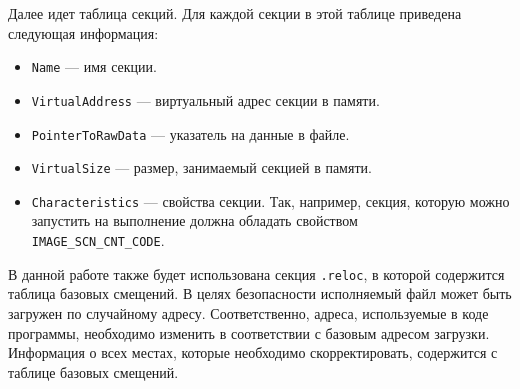 Далее идет таблица секций. Для каждой секции в этой таблице приведена следующая
информация:
\begin{itemize}
  \item \verb!Name! --- имя секции. 
  \item \verb!VirtualAddress! --- виртуальный адрес секции в памяти.
  \item \verb!PointerToRawData! --- указатель на данные в файле.
  \item \verb!VirtualSize! --- размер, занимаемый секцией в памяти.
  \item \verb!Characteristics! --- свойства секции. Так, например, секция,
    которую можно запустить на выполнение должна обладать свойством
    \\ \verb!IMAGE_SCN_CNT_CODE!.
\end{itemize}

В данной работе также будет использована секция \verb!.reloc!, в которой
содержится таблица базовых смещений. В целях безопасности исполняемый файл может
быть загружен по случайному адресу. Соответственно, адреса, используемые в коде
программы, необходимо изменить в соответствии с базовым адресом загрузки.
Информация о всех местах, которые необходимо скорректировать, содержится с
таблице базовых смещений.

%
